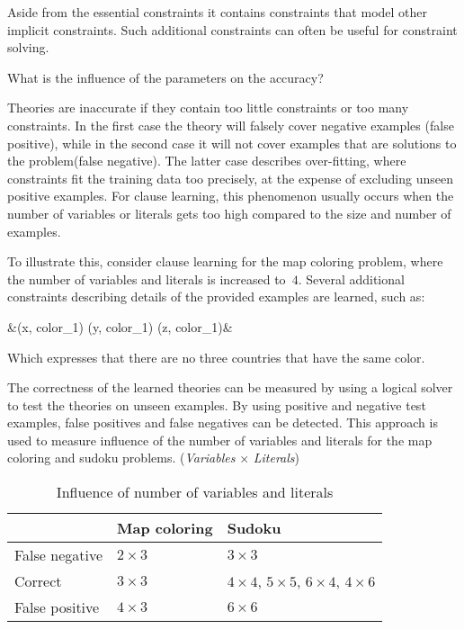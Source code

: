 Aside from the essential constraints it contains constraints that model other implicit constraints.
Such additional constraints can often be useful for constraint solving.

\begin{question}
	What is the influence of the parameters on the accuracy?
	\label{q:cd_acc_influence}
\end{question}

\begin{observation}
	Theories are inaccurate if they contain too little constraints or too many constraints.
	In the first case the theory will falsely cover negative examples (false positive), while in the second case it will not cover examples that are solutions to the problem(false negative).
	The latter case describes over-fitting, where constraints fit the training data too precisely, at the expense of excluding unseen positive examples.
	For clause learning, this phenomenon usually occurs when the number of variables or literals gets too high compared to the size and number of examples.

	To illustrate this, consider clause learning for the map coloring problem, where the number of variables and literals is increased to~$4$.
	Several additional constraints describing details of the provided examples are learned, such as: 
	\begin{shiftedflalign*}
		 &\leftarrow {}(x, color_1) \land {}(y, color_1)  \land {}(z, color_1)&
	\end{shiftedflalign*}
 	Which expresses that there are no three countries that have the same color.
\end{observation}

\begin{experiment}
	\label{exp:cd_acc_influence_par}
	The correctness of the learned theories can be measured by using a logical solver to test the theories on unseen examples.
	By using positive and negative test examples, false positives and false negatives can be detected.
	This approach is used to measure influence of the number of variables and literals for the map coloring and sudoku problems.
	(\emph{Variables} $\times$ \emph{Literals})

	\begin{table}[!htp]
		\begin{tabularx}{\textwidth}{l|ll}
			 & \textbf{Map coloring}		& \textbf{Sudoku} \\
			\toprule
			False negative 	& $2 \times 3$				& $3 \times 3$ \\
			Correct 		& $3 \times 3$				& $4 \times 4$, $5 \times 5$, $6 \times 4$, $4 \times 6$ \\
			False positive 	& $4 \times 3$				& $6 \times 6$	\\
		\end{tabularx}
		\label{tbl:cd_acc_influence}
		\caption{Influence of number of variables and literals}
	\end{table}

\end{experiment}

